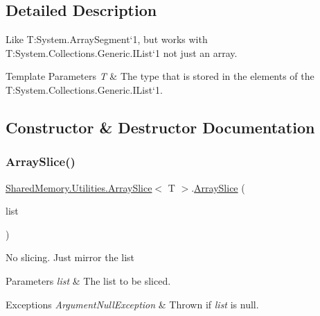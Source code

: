 \subsection{Detailed Description}
Like T\+:\+System.\+Array\+Segment`1, but works with T\+:\+System.\+Collections.\+Generic.\+I\+List`1 not just an array. 


\begin{DoxyTemplParams}{Template Parameters}
{\em T} & The type that is stored in the elements of the T\+:\+System.\+Collections.\+Generic.\+I\+List`1.\\
\hline
\end{DoxyTemplParams}


\subsection{Constructor \& Destructor Documentation}
\mbox{\label{struct_shared_memory_1_1_utilities_1_1_array_slice_a8c44c8e9338aa36a7feb4d4c69a920a6}} 
\subsubsection{\texorpdfstring{Array\+Slice()}{ArraySlice()}\hspace{0.1cm}{\footnotesize\ttfamily [1/2]}}
{\footnotesize\ttfamily \hyperlink{struct_shared_memory_1_1_utilities_1_1_array_slice}{Shared\+Memory.\+Utilities.\+Array\+Slice}$<$ T $>$.\hyperlink{struct_shared_memory_1_1_utilities_1_1_array_slice}{Array\+Slice} (\begin{DoxyParamCaption}\item[{I\+List$<$ T $>$}]{list }\end{DoxyParamCaption})\hspace{0.3cm}{\ttfamily [inline]}}



No slicing. Just mirror the list 


\begin{DoxyParams}{Parameters}
{\em list} & The list to be sliced.\\
\hline
\end{DoxyParams}

\begin{DoxyExceptions}{Exceptions}
{\em Argument\+Null\+Exception} & Thrown if {\itshape list}  is null.\\
\hline
\end{DoxyExceptions}
\mbox{\label{struct_shared_memory_1_1_utilities_1_1_array_slice_a85fa170c17d7075195df377777c80e24}} 
